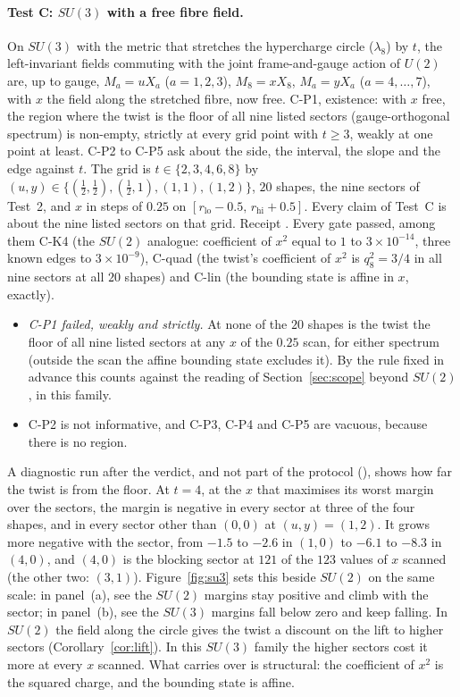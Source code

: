 \documentclass[11pt]{article}
\theoremstyle{definition}
\theoremstyle{remark}
\begin{document}
\paragraph{Test C: $SU(3)$ with a free fibre field.} On $SU(3)$ with the metric that stretches the hypercharge circle
($\lambda_8$) by $t$, the left-invariant fields commuting with the joint frame-and-gauge action of $U(2)$ are, up to
gauge, $M_a=uX_a$ ($a=1,2,3$), $M_8=xX_8$, $M_a=yX_a$ ($a=4,\dots,7$), with $x$ the field along the stretched fibre, now
free. C-P1, existence: with $x$ free, the region where the twist is the floor of all nine listed sectors
(gauge-orthogonal spectrum) is non-empty, strictly at every grid point with $t\ge3$, weakly at one point at least.
C-P2 to C-P5 ask about the side, the interval, the slope and the edge against $t$. The grid is
$t\in\{2,3,4,6,8\}$ by $(u,y)\in\{(\tfrac12,\tfrac12),(\tfrac12,1),(1,1),(1,2)\}$, $20$ shapes, the nine sectors of Test~2,
and $x$ in steps of $0.25$ on $[r_{\mathrm{lo}}-0.5,\,r_{\mathrm{hi}}+0.5]$. Every claim of Test~C is about the nine listed
sectors on that grid. Receipt . Every gate passed, among
them C-K4 (the $SU(2)$ analogue: coefficient of $x^2$ equal to $1$ to $3\times10^{-14}$, three known edges to
$3\times10^{-9}$), C-quad (the twist's coefficient of $x^2$ is $q_8^2=3/4$ in all nine sectors at all $20$ shapes) and
C-lin (the bounding state is affine in $x$, exactly).
\begin{itemize}
  \item \emph{C-P1 failed, weakly and strictly.} At none of the $20$ shapes is the twist the floor of all nine listed
  sectors at any $x$ of the $0.25$ scan, for either spectrum (outside the scan the affine bounding state excludes it).
  By the rule fixed in advance this counts against the reading of Section~\ref{sec:scope} beyond $SU(2)$, in this
  family.
  \item C-P2 is not informative, and C-P3, C-P4 and C-P5 are vacuous, because there is no region.
\end{itemize}
A diagnostic run after the verdict, and not part of the protocol (), shows how far
the twist is from the floor. At $t=4$, at the $x$ that maximises its worst margin over the sectors, the margin is
negative in every sector at three of the four shapes, and in every sector other than $(0,0)$ at $(u,y)=(1,2)$. It grows
more negative with the sector, from $-1.5$ to $-2.6$ in $(1,0)$ to $-6.1$ to $-8.3$ in $(4,0)$, and $(4,0)$ is the
blocking sector at $121$ of the $123$ values of $x$ scanned (the other two: $(3,1)$). Figure~\ref{fig:su3} sets this
beside $SU(2)$ on the same scale: in panel~(a), see the $SU(2)$ margins stay positive and climb with the sector; in
panel~(b), see the $SU(3)$ margins fall below zero and keep falling. In $SU(2)$ the field along the circle gives the twist
a discount on the lift to higher sectors (Corollary~\ref{cor:lift}). In this $SU(3)$ family the higher sectors cost it
more at every $x$ scanned. What carries over is structural: the coefficient of $x^2$ is the squared charge, and the
bounding state is affine.
\end{document}
